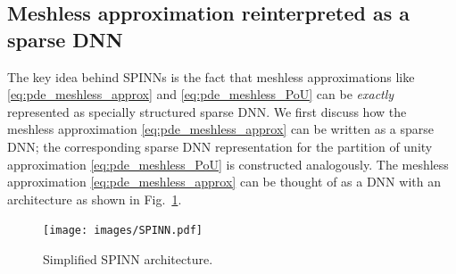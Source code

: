 \documentclass[12pt]{article}
\begin{document}
\subsection{Meshless approximation reinterpreted as a sparse DNN}
The key idea behind SPINNs is the fact that meshless approximations like \eqref{eq:pde_meshless_approx} and \eqref{eq:pde_meshless_PoU} can be \emph{exactly} represented as specially structured sparse DNN. We first discuss how the meshless approximation \eqref{eq:pde_meshless_approx} can be written as a sparse DNN; the corresponding sparse DNN representation for the partition of unity approximation \eqref{eq:pde_meshless_PoU} is constructed analogously. The meshless approximation \eqref{eq:pde_meshless_approx} can be thought of as a DNN with an architecture as shown in Fig.~\ref{fig:meshless_nn_repr}.

\begin{figure}
\centering
\texttt{[image: images/SPINN.pdf]}
\caption{Simplified SPINN architecture.}
\label{fig:meshless_nn_repr}
\end{figure}
\end{document}
